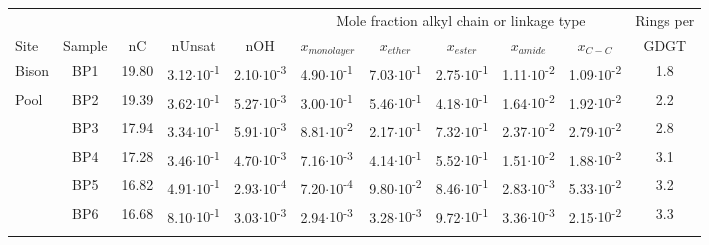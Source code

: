 {\begin{landscape}
\begin{table}
\begin{adjustbox}{width=600pt,keepaspectratio}
\begin{threeparttable}
\begin{tabular}{lccccllcccc}
\toprule
      &       &       &       &       & \multicolumn{5}{c}{Mole fraction alkyl chain or linkage type} & Rings per \\
\cmidrule{6-10}Site  & Sample & nC    & nUnsat & nOH   & \multicolumn{1}{c}{$x_{monolayer}$} & \multicolumn{1}{c}{$x_{ether}$} & $x_{ester}$ & $x_{amide}$ & $x_{C-C}$ & GDGT \\
\midrule
Bison & BP1   & 19.80 & 3.12$\cdot 10$\textsuperscript{-1} & 2.10$\cdot 10$\textsuperscript{-3} & 4.90$\cdot 10$\textsuperscript{-1} & 7.03$\cdot 10$\textsuperscript{-1} & 2.75$\cdot 10$\textsuperscript{-1} & 1.11$\cdot 10$\textsuperscript{-2} & 1.09$\cdot 10$\textsuperscript{-2} & 1.8 \\
Pool  & BP2   & 19.39 & 3.62$\cdot 10$\textsuperscript{-1} & 5.27$\cdot 10$\textsuperscript{-3} & 3.00$\cdot 10$\textsuperscript{-1} & 5.46$\cdot 10$\textsuperscript{-1} & 4.18$\cdot 10$\textsuperscript{-1} & 1.64$\cdot 10$\textsuperscript{-2} & 1.92$\cdot 10$\textsuperscript{-2} & 2.2 \\
      & BP3   & 17.94 & 3.34$\cdot 10$\textsuperscript{-1} & 5.91$\cdot 10$\textsuperscript{-3} & 8.81$\cdot 10$\textsuperscript{-2} & 2.17$\cdot 10$\textsuperscript{-1} & 7.32$\cdot 10$\textsuperscript{-1} & 2.37$\cdot 10$\textsuperscript{-2} & 2.79$\cdot 10$\textsuperscript{-2} & 2.8 \\
      & BP4   & 17.28 & 3.46$\cdot 10$\textsuperscript{-1} & 4.70$\cdot 10$\textsuperscript{-3} & 7.16$\cdot 10$\textsuperscript{-3} & 4.14$\cdot 10$\textsuperscript{-1} & 5.52$\cdot 10$\textsuperscript{-1} & 1.51$\cdot 10$\textsuperscript{-2} & 1.88$\cdot 10$\textsuperscript{-2} & 3.1 \\
      & BP5   & 16.82 & 4.91$\cdot 10$\textsuperscript{-1} & 2.93$\cdot 10$\textsuperscript{-4} & 7.20$\cdot 10$\textsuperscript{-4} & 9.80$\cdot 10$\textsuperscript{-2} & 8.46$\cdot 10$\textsuperscript{-1} & 2.83$\cdot 10$\textsuperscript{-3} & 5.33$\cdot 10$\textsuperscript{-2} & 3.2 \\
      & BP6   & 16.68 & 8.10$\cdot 10$\textsuperscript{-1} & 3.03$\cdot 10$\textsuperscript{-3} & 2.94$\cdot 10$\textsuperscript{-3} & 3.28$\cdot 10$\textsuperscript{-3} & 9.72$\cdot 10$\textsuperscript{-1} & 3.36$\cdot 10$\textsuperscript{-3} & 2.15$\cdot 10$\textsuperscript{-2} & 3.3 \\
      &       &       &       &       &       &       &       &       &       &  \\

\end{tabular}
\end{threeparttable}
\end{adjustbox}
\end{table}
\end{landscape}}
